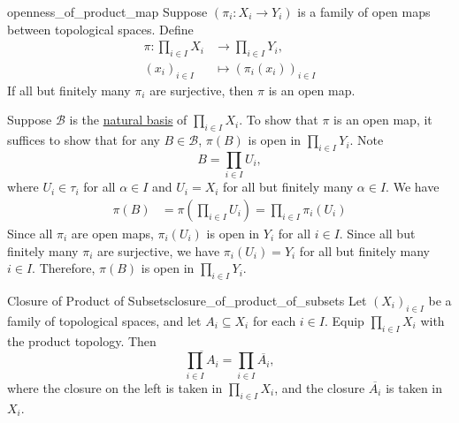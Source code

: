 \documentclass{report}
\begin{document}
\begin{proposition}{}{openness_of_product_map}
	Suppose $(\pi_i:X_i \to Y_i)$ is a family of open maps between topological spaces. Define
	\begin{align*}
		\pi: \prod_{i \in I} X_i & \longrightarrow \prod_{i \in I} Y_i, \\
		(x_i)_{i \in I}          & \longmapsto (\pi_i(x_i))_{i \in I}
	\end{align*}
	If all but finitely many $\pi_i$ are surjective, then $\pi$ is an open map.
\end{proposition}
\begin{prf}
	Suppose $\mathcal{B}$ is the \hyperref[th:basis_of_product_topology]{natural basis} of $\prod_{i \in I} X_i$. To show that $\pi$ is an open map, it suffices to show that for any $B\in \mathcal{B}$, $\pi(B)$ is open in $\prod_{i \in I} Y_i$. Note 
	\[
	B=\prod_{i\in I}U_i,
	\]
	where $U_i\in \tau_i$ for all $\alpha\in I$ and $U_i=X_i$ for all but finitely many $\alpha\in I$. We have
	\begin{align*}
		\pi(B) &= \pi\left(\prod_{i\in I}U_i\right) = \prod_{i\in I}\pi_i(U_i) 
	\end{align*}
	Since all $\pi_i$ are open maps, $\pi_i(U_i)$ is open in $Y_i$ for all $i\in I$. Since all but finitely many $\pi_i$ are surjective, we have $\pi_i(U_i)=Y_i$ for all but finitely many $i\in I$. Therefore, $\pi(B)$ is open in $\prod_{i \in I} Y_i$.
\end{prf}

\begin{proposition}{Closure of Product of Subsets}{closure_of_product_of_subsets}
Let $(X_i)_{i\in I}$ be a family of topological spaces, and let
$A_i\subseteq X_i$ for each $i\in I$. Equip $\prod_{i\in I}X_i$ with the
product topology. Then
\[
\overline{\prod_{i\in I} A_i}
=
\prod_{i\in I}\overline{A_i},
\]
where the closure on the left is taken in $\prod_{i\in I}X_i$, and the
closure $\overline{A_i}$ is taken in $X_i$.
\end{proposition}
\end{document}
